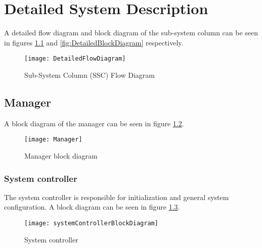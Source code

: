 

\chapter{Detailed System Description}
\label{sec:Detailed System Description}

A detailed flow diagram and block diagram of the sub-system column can be seen in figures \ref{fig:DetailedFlowDiagram} and \ref{fig:DetailedBlockDiagram} respectively.
\begin{figure}[h]
\centering
\captionsetup{justification=centering}
\captionsetup{width=.9\linewidth}
\centerline{
\mbox{\texttt{[image: DetailedFlowDiagram]}}
}
\center\caption{Sub-System Column (SSC) Flow Diagram}
\label{fig:DetailedFlowDiagram}
\end{figure}

\section{Manager}
\label{sec:manager}

A block diagram of the manager can be seen in figure \ref{fig:Manager block diagram}.
\begin{figure}[h]
\centering
\captionsetup{justification=centering}
\captionsetup{width=.9\linewidth}
\centerline{
\mbox{\texttt{[image: Manager]}}
}
\center\caption{Manager block diagram}
\label{fig:Manager block diagram}
\end{figure}

\subsection{System controller}
\label{sec:System controller}

The system controller is responsible for initialization and general system configuration.
A block diagram can be seen in figure \ref{fig:System controller}.

\begin{figure}[h]
\centering
\captionsetup{justification=centering}
\captionsetup{width=.9\linewidth}
\centerline{
\mbox{\texttt{[image: systemControllerBlockDiagram]}}
}
\center\caption{System controller}
\label{fig:System controller}
\end{figure}

